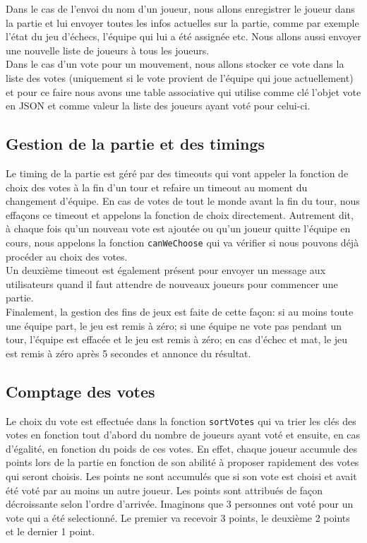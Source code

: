 \documentclass{article}
\begin{document}
Dans le cas de l'envoi du nom d'un joueur, nous allons enregistrer le joueur dans la partie et lui envoyer toutes les infos actuelles sur la partie, comme par exemple l'état du jeu d'échecs, l'équipe qui lui a été assignée etc. Nous allons aussi envoyer une nouvelle liste de joueurs à tous les joueurs. \\

Dans le cas d'un vote pour un mouvement, nous allons stocker ce vote dans la liste des votes (uniquement si le vote provient de l'équipe qui joue actuellement) et pour ce faire nous avons une table associative qui utilise comme clé l'objet vote en JSON et comme valeur la liste des joueurs ayant voté pour celui-ci.

\subsection{Gestion de la partie et des timings}
Le timing de la partie est géré par des timeouts qui vont appeler la fonction de choix des votes à la fin d'un tour et refaire un timeout au moment du changement d'équipe. En cas de votes de tout le monde avant la fin du tour, nous effaçons ce timeout et appelons la fonction de choix directement. Autrement dit, à chaque fois qu'un nouveau vote est ajoutée ou qu'un joueur quitte l'équipe en cours, nous appelons la fonction \verb+canWeChoose+ qui va vérifier si nous pouvons déjà procéder au choix des votes. \\

Un deuxième timeout est également présent pour envoyer un message aux utilisateurs quand il faut attendre de nouveaux joueurs pour commencer une partie. \\

Finalement, la gestion des fins de jeux est faite de cette façon: si au moins toute une équipe part, le jeu est remis à zéro; si une équipe ne vote pas pendant un tour, l'équipe est effacée et le jeu est remis à zéro; en cas d'échec et mat, le jeu est remis à zéro après 5 secondes et annonce du résultat.

\subsection{Comptage des votes}
Le choix du vote est effectuée dans la fonction \verb+sortVotes+ qui va trier les clés des votes en fonction tout d'abord du nombre de joueurs ayant voté et ensuite, en cas d'égalité, en fonction du poids de ces votes. En effet, chaque joueur accumule des points lors de la partie en fonction de son abilité à proposer rapidement des votes qui seront choisis. Les points ne sont accumulés que si son vote est choisi et avait été voté par au moins un autre joueur. Les points sont attribués de façon décroissante selon l'ordre d'arrivée. Imaginons que 3 personnes ont voté pour un vote qui a été selectionné. Le premier va recevoir 3 points, le deuxième 2 points et le dernier 1 point.
\end{document}
